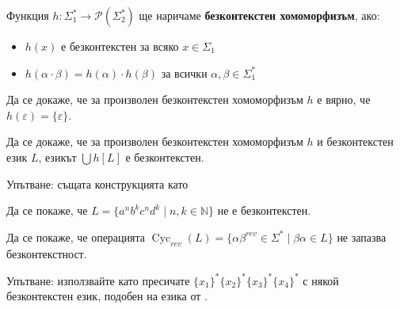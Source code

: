 \begin{definition}
    Функция $h : \Sigma_1^* \rightarrow \mathcal{P}(\Sigma_2^*)$ ще наричаме \textbf{безконтекстен хомоморфизъм}, ако:
    \begin{itemize}
        \item $h(x)$ е безконтекстен за всяко $x \in \Sigma_1$
        \item $h(\alpha \cdot \beta) = h(\alpha) \cdot h(\beta)$ за всички $\alpha, \beta \in \Sigma_1^*$
    \end{itemize}
\end{definition}

\begin{problem}
Да се докаже, че за произволен безконтекстен хомоморфизъм $h$ е вярно, че $h(\varepsilon) = \{ \varepsilon \}$.
\end{problem}

\begin{problem}
Да се докаже, че за произволен безконтекстен хомоморфизъм $h$ и безконтекстен език $L$, езикът $\bigcup h[L]$ е безконтекстен.

Упътване: същата конструкцията като 
\end{problem}

\begin{problem}
Да се покаже, че $L = \{ a^n b^k c^n d^k \mid n, k \in \mathbb{N} \}$ не е безконтекстен.
\end{problem}

\begin{problem}
Да се покаже, че операцията $\operatorname{Cyc}_{rev}(L) = \{ \alpha \beta^{rev} \in \Sigma^* \mid \beta \alpha \in L \}$ не запазва безконтекстност.

Упътване: използвайте  като пресичате $\{ x_1 \}^* \{ x_2 \}^* \{ x_3 \}^* \{ x_4 \}^*$ с някой безконтекстен език, подобен на езика от .
\end{problem}
